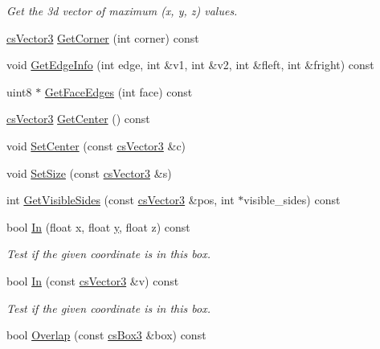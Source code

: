 \begin{DoxyCompactItemize}
\begin{DoxyCompactList}\small\item\em Get the 3d vector of maximum (x, y, z) values. \end{DoxyCompactList}\item 
\hyperlink{classcsVector3}{cs\+Vector3} \hyperlink{classcsBox3_a414acf5fe1fee22d056e65fd0aa89fd8}{Get\+Corner} (int corner) const 
\item 
void \hyperlink{classcsBox3_a7dd86bf643bb17b8059dd75b93a11f76}{Get\+Edge\+Info} (int edge, int \&v1, int \&v2, int \&fleft, int \&fright) const 
\item 
uint8 $\ast$ \hyperlink{classcsBox3_ae2c05ca56f6200bc93d373a0866357db}{Get\+Face\+Edges} (int face) const 
\item 
\hyperlink{classcsVector3}{cs\+Vector3} \hyperlink{classcsBox3_a3bb267ed23f663a3c24da8b74727ce8c}{Get\+Center} () const 
\item 
void \hyperlink{classcsBox3_a81d9340a00e6c1c6a06e5aa7fc23434b}{Set\+Center} (const \hyperlink{classcsVector3}{cs\+Vector3} \&c)
\item 
void \hyperlink{classcsBox3_a7045c1e7c84379c62797f52ee8b66109}{Set\+Size} (const \hyperlink{classcsVector3}{cs\+Vector3} \&s)
\item 
int \hyperlink{classcsBox3_a8387b45783c4a8b3721016691d54947e}{Get\+Visible\+Sides} (const \hyperlink{classcsVector3}{cs\+Vector3} \&pos, int $\ast$visible\+\_\+sides) const 
\item 
bool \hyperlink{classcsBox3_afd1f8ba93d546d19e9c00edaa855943c}{In} (float x, float \hyperlink{IceUtils_8h_aa7ffaed69623192258fb8679569ff9ba}{y}, float z) const 
\begin{DoxyCompactList}\small\item\em Test if the given coordinate is in this box. \end{DoxyCompactList}\item 
bool \hyperlink{classcsBox3_ad8e8a62251204aae1b1898534e21a759}{In} (const \hyperlink{classcsVector3}{cs\+Vector3} \&v) const \hypertarget{classcsBox3_ad8e8a62251204aae1b1898534e21a759}{}\label{classcsBox3_ad8e8a62251204aae1b1898534e21a759}

\begin{DoxyCompactList}\small\item\em Test if the given coordinate is in this box. \end{DoxyCompactList}\item 
bool \hyperlink{classcsBox3_acba21deeca4e73ac49e175ec9077bb9b}{Overlap} (const \hyperlink{classcsBox3}{cs\+Box3} \&box) const \hypertarget{classcsBox3_acba21deeca4e73ac49e175ec9077bb9b}{}\label{classcsBox3_acba21deeca4e73ac49e175ec9077bb9b}


\end{DoxyCompactItemize}
